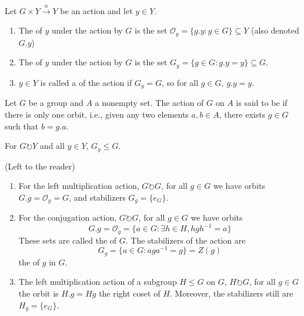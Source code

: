 \documentclass[12pt, a4paper, twoside, openright, titlepage]{book}
\begin{document}
\begin{defn}{}{}
        Let $G\times Y \xrightarrow{a} Y$ be an action and let $y \in Y$. \begin{enumerate}
                \item The  of $y$ under the action by $G$ is the set $\mathcal{O}_y = \{g.y:g\in G\}\subseteq Y$ (also denoted $G.y$)
                \item The  of $y$ under the action by $G$ is the set $G_y = \{g\in G:g.y = y\}\subseteq G$.
                \item $y \in Y$ is called a  of the action if $G_y = G$, so for all $g \in G$, $g.y = y$.
        \end{enumerate}
\end{defn}

\begin{defn}{}{}
    Let $G$ be a group and $A$ a nonempty set. The action of $G$ on $A$ is said to be  if there is only one orbit, i.e., given any two elements $a,b \in A$, there exists $g \in G$ such that $b = g.a$.
\end{defn}



\begin{prop}{}{}
        For $G \circlearrowright Y$ and all $y \in Y$, $G_y \leq G$.
\end{prop}
\begin{proof*}{}{}
        (Left to the reader)
\end{proof*}


\begin{eg}{}{}
        \leavevmode
        \begin{enumerate}
                \item For the left multiplication action, $G \circlearrowright G$, for all $g \in G$ we have orbits $G.g = \mathcal{O}_g = G$, and stabilizers $G_g = \{e_G\}$.
                \item For the conjugation action, $G \circlearrowright G$, for all $g \in G$ we have orbits \begin{equation}
                                G.g = \mathcal{O}_g = \{a \in G:\exists h \in H, hgh^{-1} = a\}
                \end{equation}
                        These sets are called the  of $G$. The stabilizers of the action are \begin{equation}
                                G_g = \{a \in G: aga^{-1} = g\} = Z(g)
                        \end{equation}
                        the  of $g$ in $G$.
                \item The left multiplication action of a subgroup $H \leq G$ on $G$, $H \circlearrowright G$, for all $g \in G$ the orbit is $H.g = Hg$ the right coset of $H$. Moreover, the stabilizers still are $H_g = \{e_G\}$.
        \end{enumerate}
\end{eg}
\end{document}
